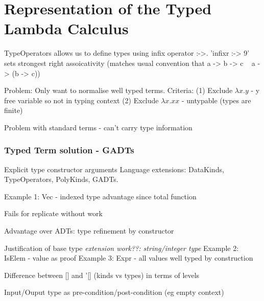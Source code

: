 \chapter{Representation of the Typed Lambda Calculus}
\label{chap:typedlamadacalculus}

TypeOperators allows us to define types using infix operator :->.
'infixr :-> 9' sets strongest right assoicativity (matches usual convention that a -> b -> c ~ a -> (b -> c))

Problem: Only want to normalise well typed terms.
Criteria: 
(1) Exclude $\lambda x . y$ - y free variable so not in typing context
(2) Exclude $\lambda x.xx$ - untypable (types are finite)

Problem with standard terms - can't carry type information

\subsection{Typed Term solution - GADTs}

\cite{GADTs}
Explicit type constructor arguments
Language extensions:
DataKinds, TypeOperators, PolyKinds, GADTs.

Example 1: Vec - indexed type advantage since total function

Fails for replicate without work \cite{DependentHaskell}

Advantage over ADTs: type refinement by constructor

Justification of base type \textit{extension work??: string/integer type}
Example 2: IsElem - value as proof
Example 3: Expr - all values well typed by construction

Difference between [] and '[] (kinds vs types) in terms of levels

Input/Ouput type as pre-condition/post-condition (eg empty context)

